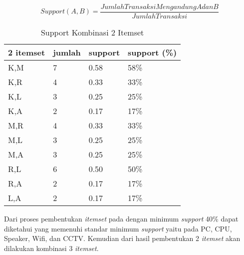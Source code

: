 \begin{enumerate}
\begin{equation}
Support (A,B) =\frac{Jumlah Transaksi Mengandung A dan B}{Jumlah Transaksi} 
\end{equation} 

\begin{table}[!ht]
\caption{Support Kombinasi 2 Itemset}
\centering
\begin{tabular}{|l|l|l|l|}
\hline
2 itemset & jumlah & support & support (\%) \\ \hline
K,M       & 7      & 0.58    & 58\%         \\ \hline
K,R       & 4      & 0.33    & 33\%         \\ \hline
K,L       & 3      & 0.25    & 25\%         \\ \hline
K,A       & 2      & 0.17    & 17\%         \\ \hline
M,R       & 4      & 0.33    & 33\%         \\ \hline
M,L       & 3      & 0.25    & 25\%         \\ \hline
M,A       & 3      & 0.25    & 25\%         \\ \hline
R,L       & 6      & 0.50    & 50\%         \\ \hline
R,A       & 2      & 0.17    & 17\%         \\ \hline
L,A       & 2      & 0.17    & 17\%         \\ \hline
\end{tabular}
\end{table}

\par Dari proses pembentukan \textit{itemset} pada dengan minimum \textit{support} 40\% dapat diketahui yang memenuhi standar minimum \textit{support} yaitu pada  PC, CPU, Speaker, Wifi, dan CCTV. Kemudian dari hasil pembentukan 2 \textit{itemset} akan dilakukan kombinasi 3 \textit{itemset}.


\end{enumerate}

